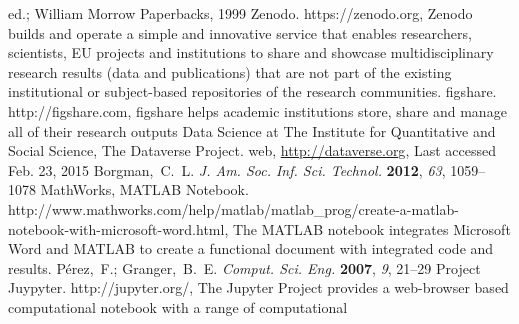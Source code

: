 \documentclass[journal=accacs,manuscript=article,email=true]{achemso}
\begin{document}
\begin{mcitethebibliography}{35}
  ed.; William Morrow Paperbacks, 1999\relax
\mciteBstWouldAddEndPuncttrue
\mciteSetBstMidEndSepPunct{\mcitedefaultmidpunct}
{\mcitedefaultendpunct}{\mcitedefaultseppunct}\relax
\EndOfBibitem
{}
Zenodo. https://zenodo.org, Zenodo builds and operate a simple and innovative
  service that enables researchers, scientists, EU projects and institutions to
  share and showcase multidisciplinary research results (data and publications)
  that are not part of the existing institutional or subject-based repositories
  of the research communities.\relax
\mciteBstWouldAddEndPunctfalse
\mciteSetBstMidEndSepPunct{\mcitedefaultmidpunct}
{}{\mcitedefaultseppunct}\relax
\EndOfBibitem
{}
figshare. http://figshare.com, figshare helps academic institutions store,
  share and manage all of their research outputs\relax
\mciteBstWouldAddEndPuncttrue
\mciteSetBstMidEndSepPunct{\mcitedefaultmidpunct}
{\mcitedefaultendpunct}{\mcitedefaultseppunct}\relax
\EndOfBibitem
{}
{Data Science at The Institute for Quantitative and Social Science}, The
  Dataverse Project. web, \url{http://dataverse.org}, Last accessed Feb. 23,
  2015\relax
\mciteBstWouldAddEndPuncttrue
\mciteSetBstMidEndSepPunct{\mcitedefaultmidpunct}
{\mcitedefaultendpunct}{\mcitedefaultseppunct}\relax
\EndOfBibitem
{}
Borgman,~C.~L. \emph{J. Am. Soc. Inf. Sci. Technol.} \textbf{2012}, \emph{63},
  1059--1078\relax
\mciteBstWouldAddEndPuncttrue
\mciteSetBstMidEndSepPunct{\mcitedefaultmidpunct}
{\mcitedefaultendpunct}{\mcitedefaultseppunct}\relax
\EndOfBibitem
{}
{MathWorks}, MATLAB Notebook.
  http://www.mathworks.com/help/matlab/matlab\_prog/create-a-matlab-notebook-with-microsoft-word.html,
  The MATLAB notebook integrates Microsoft Word and MATLAB to create a
  functional document with integrated code and results.\relax
\mciteBstWouldAddEndPunctfalse
\mciteSetBstMidEndSepPunct{\mcitedefaultmidpunct}
{}{\mcitedefaultseppunct}\relax
\EndOfBibitem
{}
P\'erez,~F.; Granger,~B.~E. \emph{Comput. Sci. Eng.} \textbf{2007}, \emph{9},
  21--29\relax
\mciteBstWouldAddEndPuncttrue
\mciteSetBstMidEndSepPunct{\mcitedefaultmidpunct}
{\mcitedefaultendpunct}{\mcitedefaultseppunct}\relax
\EndOfBibitem
{}
Project Juypyter. http://jupyter.org/, The Jupyter Project provides a
  web-browser based computational notebook with a range of computational

\end{mcitethebibliography}
\end{document}
